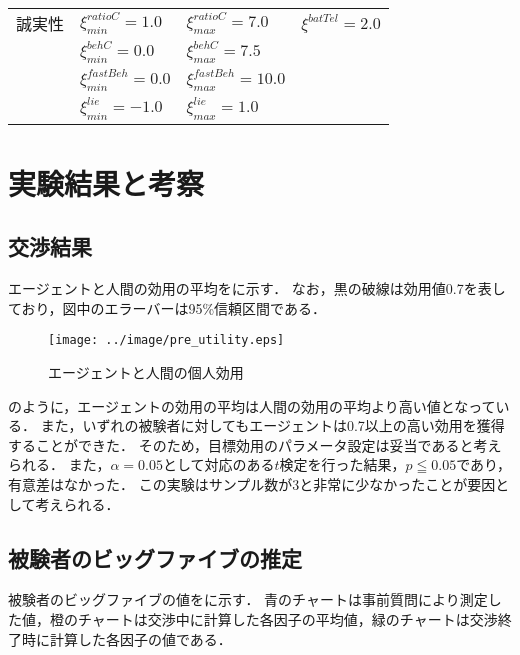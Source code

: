 \begin{table}[!tb]
\begin{tabular}{llll}
        誠実性 & $\xi_{min}^{\mathit{ratioC}} = 1.0$ & $\xi_{max}^{\mathit{ratioC}} = 7.0$ & $\xi^{batTel} = 2.0$ \\
        & $\xi_{min}^{\mathit{behC}} = 0.0$ & $\xi_{max}^{\mathit{behC}} = 7.5$ \\
        & $\xi_{min}^{\mathit{fastBeh}} = 0.0$ & $\xi_{max}^{\mathit{fastBeh}} = 10.0$ \\
        & $\xi_{min}^{\mathit{lie}} = -1.0$ & $\xi_{max}^{\mathit{lie}} = 1.0$ \\ \bottomrule
    \end{tabular}
    \label{tab:pre_xi-param}
\end{table}

\section{実験結果と考察}
\subsection{交渉結果}
エージェントと人間の効用の平均をに示す．
なお，黒の破線は効用値0.7を表しており，図中のエラーバーは95\%信頼区間である．

\begin{figure}[bt]
    \centering
    \texttt{[image: ../image/pre\_utility.eps]}
    \caption{エージェントと人間の個人効用}
    \label{fig:pre_util}
\end{figure}

のように，エージェントの効用の平均は人間の効用の平均より高い値となっている．
また，いずれの被験者に対してもエージェントは0.7以上の高い効用を獲得することができた．
そのため，目標効用のパラメータ設定は妥当であると考えられる．
また，$\alpha = 0.05$として対応のある$t$検定を行った結果，$p \leqq 0.05$であり，有意差はなかった．
この実験はサンプル数が3と非常に少なかったことが要因として考えられる．

\subsection{被験者のビッグファイブの推定}
被験者のビッグファイブの値をに示す．
青のチャートは事前質問により測定した値，橙のチャートは交渉中に計算した各因子の平均値，緑のチャートは交渉終了時に計算した各因子の値である．

